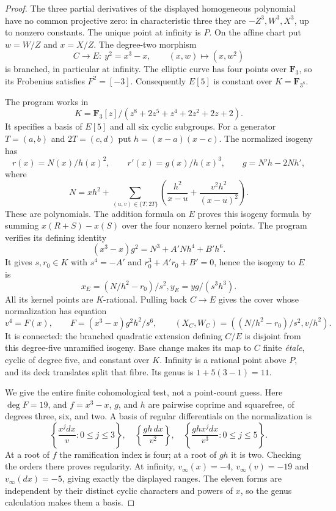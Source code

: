 \documentclass[11pt,a4paper]{article}
\begin{document}
\begin{proof}
The three partial derivatives of the displayed homogeneous
polynomial have no common projective zero: in characteristic
three they are $-Z^3,W^3,X^3$, up to nonzero constants.
The unique point at infinity is $P$. On the affine chart put
$w=W/Z$ and $x=X/Z$. The degree-two morphism
\[
       C\longrightarrow E:\ y^2=x^3-x,
                    \qquad (x,w)\longmapsto(x,w^2)
\]
is branched, in particular at infinity. The elliptic curve has
four points over $\mathbf F_3$, so its Frobenius satisfies
$F^2=[-3]$. Consequently $E[5]$ is constant over
$K=\mathbf F_{3^8}$.

The program  works in
\[
 K=\mathbf F_3[z]/
       (z^8+2z^5+z^4+2z^2+2z+2).
\]
It specifies a basis of $E[5]$ and all six cyclic subgroups.
For a generator $T=(a,b)$ and $2T=(c,d)$ put
$h=(x-a)(x-c)$. The normalized isogeny has
\[
 r(x)=N(x)/h(x)^2,
 \qquad r'(x)=g(x)/h(x)^3,\qquad
       g=N'h-2Nh',
\]
where
\[
 N=xh^2+
       \sum_{(u,v)\in\{T,2T\}}
        \left(\frac{h^2}{x-u}+\frac{v^2h^2}{(x-u)^2}\right).
\]
These are polynomials. The addition formula on $E$ proves
this isogeny formula by summing $x(R+S)-x(S)$ over the four
nonzero kernel points. The program verifies its defining
identity
\[
 (x^3-x)g^2=N^3+A'Nh^4+B'h^6.
\]
It gives $s,r_0\in K$ with $s^4=-A'$ and
$r_0^3+A'r_0+B'=0$, hence the isogeny to $E$ is
\[
       x_E=(N/h^2-r_0)/s^2,
       y_E=yg/(s^3h^3).
\]
All its kernel points are $K$-rational. Pulling back
$C\to E$ gives the cover whose normalization has equation
\[
       v^4=F(x),\qquad
       F=(x^3-x)g^2h^2/s^6,\qquad
       (X_C,W_C)=((N/h^2-r_0)/s^2,v/h^2).              \tag{B.Q.1}
\]
It is connected: the branched quadratic extension defining
$C/E$ is disjoint from this degree-five unramified isogeny.
Base change makes its map to $C$ finite \emph{\'etale}, cyclic
of degree five, and constant over $K$. Infinity is a rational
point above $P$, and its deck translates split that fibre.
Its genus is $1+5(3-1)=11$.

We give the entire finite cohomological test, not a point-count
guess. Here $\deg F=19$, and $f=x^3-x$, $g$, and $h$ are
pairwise coprime and squarefree, of degrees three, six, and two.
A basis of regular differentials on the normalization is
\[
 \left\{\frac{x^jdx}{v}:0\le j\le3\right\},\quad
 \left\{\frac{gh\,dx}{v^2}\right\},\quad
 \left\{\frac{ghx^jdx}{v^3}:0\le j\le5\right\}.       \tag{B.Q.2}
\]
At a root of $f$ the ramification index is four; at a root of
$gh$ it is two. Checking the orders there proves regularity.
At infinity, $v_\infty(x)=-4$, $v_\infty(v)=-19$ and
$v_\infty(dx)=-5$, giving exactly the displayed ranges.
The eleven forms are independent by their distinct cyclic
characters and powers of $x$, so the genus calculation makes
them a basis.


\end{proof}
\end{document}
